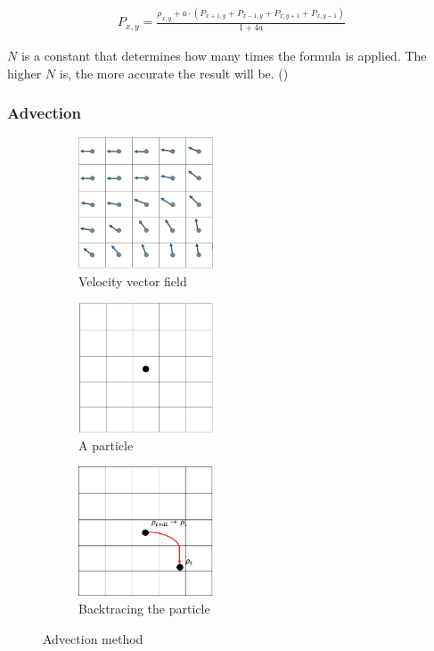\documentclass[a4paper,12pt,titlepage]{article}
\begin{document}
\[
	\begin{array}{ll}
		P_{x, y} = \frac{\rho_{x, y} + a \cdot (P_{x+1, y} + P_{x-1, y} + P_{x, y+1} + P_{x, y-1})}{1+4a}
	\end{array}
\]

$N$ is a constant that determines how many times the formula is applied. The higher $N$ is, the more accurate the result will be. (\cite{josstam})

\subsubsection{Advection}

\begin{figure}[H]
	\centering
	\begin{subfigure}{0.3\textwidth}
		\centering
		\includegraphics[width=4cm]{resources/advection1.png}
		\caption{Velocity vector field}
	\end{subfigure}
	\begin{subfigure}{0.3\textwidth}
		\centering
		\includegraphics[width=4cm]{resources/advection2.png}
		\caption{A particle}
		\label{fig:aparticle}
	\end{subfigure}
	\begin{subfigure}{0.3\textwidth}
		\centering
		\includegraphics[width=4cm]{resources/advection3.png}
		\caption{Backtracing the particle}
		\label{fig:backtrace}
	\end{subfigure}
	\caption {Advection method}
	\label{fig:advection}
\end{figure}
\end{document}
